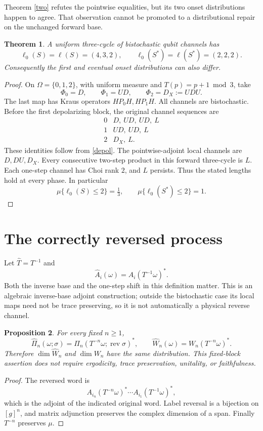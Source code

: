 \documentclass[11pt,a4paper]{article}
\newtheorem{theorem}{Theorem}
\newtheorem{proposition}[theorem]{Proposition}
\begin{document}
Theorem \ref{two} refutes the pointwise equalities, but its two onset distributions happen to agree. That observation cannot be promoted to a distributional repair on the unchanged forward base.

\begin{theorem}\label{three}
A uniform three-cycle of bistochastic qubit channels has
\[
 \ell_0(S)=\ell(S)=(4,3,2),\qquad
 \ell_0(S^*)=\ell(S^*)=(2,2,2).
\]
Consequently the first and eventual onset distributions can also differ.
\end{theorem}
\begin{proof}
On $\Omega=\{0,1,2\}$, with uniform measure and $T(p)=p+1\bmod3$, take
\[
 \Phi_0=D,\qquad \Phi_1=UD,\qquad \Phi_2=D_X:=UDU.
\]
The last map has Kraus operators $HP_0H,HP_1H$. All channels are bistochastic. Before the first depolarizing block, the original channel sequences are
\[
 \begin{array}{c|l}
 0&D,\ UD,\ UD,\ L\\
 1&UD,\ UD,\ L\\
 2&D_X,\ L .
 \end{array}
\]
These identities follow from \eqref{depol}. The pointwise-adjoint local channels are $D,DU,D_X$. Every consecutive two-step product in this forward three-cycle is $L$. Each one-step channel has Choi rank $2$, and $L$ persists. Thus the stated lengths hold at every phase. In particular
\[
 \mu\{\ell_0(S)\leq2\}=\tfrac13,\qquad
 \mu\{\ell_0(S^*)\leq2\}=1.
\]
\end{proof}

\section{The correctly reversed process}
Let $\widehat T=T^{-1}$ and
\[
 \widehat A_i(\omega)=A_i(T^{-1}\omega)^*.
\]
Both the inverse base and the one-step shift in this definition matter. This is an algebraic inverse-base adjoint construction; outside the bistochastic case its local maps need not be trace preserving, so it is not automatically a physical reverse channel.

\begin{proposition}\label{fixed}
For every fixed $n\geq1$,
\[
 \widehat\Pi_n(\omega;\sigma)
 =\Pi_n(T^{-n}\omega;\operatorname{rev}\sigma)^*,\qquad
 \widehat W_n(\omega)=W_n(T^{-n}\omega)^*.
\]
Therefore $\dim\widehat W_n$ and $\dim W_n$ have the same distribution. This fixed-block assertion does not require ergodicity, trace preservation, unitality, or faithfulness.
\end{proposition}
\begin{proof}
The reversed word is
\[
 A_{i_n}(T^{-n}\omega)^*\cdots A_{i_1}(T^{-1}\omega)^*,
\]
which is the adjoint of the indicated original word. Label reversal is a bijection on $[g]^n$, and matrix adjunction preserves the complex dimension of a span. Finally $T^{-n}$ preserves $\mu$.
\end{proof}
\end{document}
